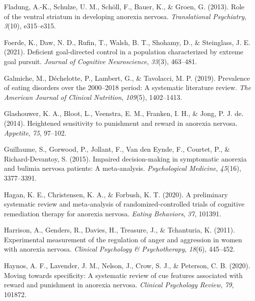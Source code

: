 \documentclass[
  man,floatsintext]{apa6}
\newlength{\cslhangindent}
\newlength{\cslentryspacingunit} %
\newenvironment{CSLReferences}[2] %
 {%
  \setlength{\parindent}{0pt}
  \ifodd #1
  \let\oldpar\par
  \def\par{\hangindent=\cslhangindent\oldpar}
  \fi
  \setlength{\parskip}{#2\cslentryspacingunit}
 }%
 {}
\begin{document}
\begin{CSLReferences}{1}{0}
\leavevmode{}%
Fladung, A.-K., Schulze, U. M., Schöll, F., Bauer, K., \& Groen, G. (2013). Role of the ventral striatum in developing anorexia nervosa. \emph{Translational Psychiatry}, \emph{3}(10), e315--e315.

\leavevmode{}%
Foerde, K., Daw, N. D., Rufin, T., Walsh, B. T., Shohamy, D., \& Steinglass, J. E. (2021). Deficient goal-directed control in a population characterized by extreme goal pursuit. \emph{Journal of Cognitive Neuroscience}, \emph{33}(3), 463--481.

\leavevmode{}%
Galmiche, M., Déchelotte, P., Lambert, G., \& Tavolacci, M. P. (2019). Prevalence of eating disorders over the 2000--2018 period: A systematic literature review. \emph{The American Journal of Clinical Nutrition}, \emph{109}(5), 1402--1413.

\leavevmode{}%
Glashouwer, K. A., Bloot, L., Veenstra, E. M., Franken, I. H., \& Jong, P. J. de. (2014). Heightened sensitivity to punishment and reward in anorexia nervosa. \emph{Appetite}, \emph{75}, 97--102.

\leavevmode{}%
Guillaume, S., Gorwood, P., Jollant, F., Van den Eynde, F., Courtet, P., \& Richard-Devantoy, S. (2015). Impaired decision-making in symptomatic anorexia and bulimia nervosa patients: A meta-analysis. \emph{Psychological Medicine}, \emph{45}(16), 3377--3391.

\leavevmode{}%
Hagan, K. E., Christensen, K. A., \& Forbush, K. T. (2020). A preliminary systematic review and meta-analysis of randomized-controlled trials of cognitive remediation therapy for anorexia nervosa. \emph{Eating Behaviors}, \emph{37}, 101391.

\leavevmode{}%
Harrison, A., Genders, R., Davies, H., Treasure, J., \& Tchanturia, K. (2011). Experimental measurement of the regulation of anger and aggression in women with anorexia nervosa. \emph{Clinical Psychology \& Psychotherapy}, \emph{18}(6), 445--452.

\leavevmode{}%
Haynos, A. F., Lavender, J. M., Nelson, J., Crow, S. J., \& Peterson, C. B. (2020). Moving towards specificity: A systematic review of cue features associated with reward and punishment in anorexia nervosa. \emph{Clinical Psychology Review}, \emph{79}, 101872.


\end{CSLReferences}
\end{document}
